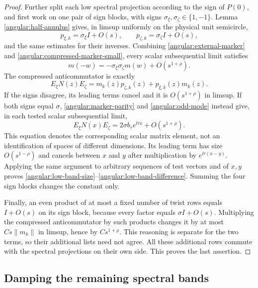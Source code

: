 \begin{proof}
Further split each low spectral projection according to the sign of
$P(0)$, and first work on one pair of sign blocks, with signs
$\sigma_\xi,\sigma_\zeta\in\{1,-1\}$.  Lemma
\ref{angular:half-annulus} gives, in limsup uniformly on the physical
unit semicircle,
\[
 p_{\xi,k}=\sigma_\xi I+O(s),\qquad
 p_{\zeta,k}=\sigma_\zeta I+O(s),
\]
and the same estimates for their inverses.  Combining
\eqref{angular:external-marker} and
\eqref{angular:compressed-marker-small}, every scalar subsequential
limit satisfies
\begin{equation}\label{angular:marker-parity}
 m(-w)=-\sigma_\xi\sigma_\zeta m(w)+O(s^{1+\rho}).
\end{equation}
The compressed anticommutator is exactly
\[
 E_\xi N(z)E_\zeta
 =m_k(z)p_{\zeta,k}(z)+p_{\xi,k}(z)m_k(z).
\]
If the signs disagree, its leading terms cancel and it is
$O(s^{1+\rho})$ in limsup.  If both signs equal $\sigma$,
\eqref{angular:marker-parity} and \eqref{angular:odd-mode} instead give,
in each tested scalar subsequential limit,
\begin{equation}\label{angular:leading-mode}
 E_\xi N(x)E_\zeta
 =2\sigma b_\tau e^{\ii\tau x}+O(s^{1+\rho}).
\end{equation}
This equation denotes the corresponding scalar matrix element, not
an identification of spaces of different dimensions.  Its leading
term has size $O(s^{1-\rho})$ and cancels between $x$ and $y$ after
multiplication by $e^{\ii\tau(x-y)}$.  Applying the same argument to
arbitrary sequences of test vectors and of $x,y$ proves
\eqref{angular:low-band-size}--\eqref{angular:low-band-difference}.
Summing the four sign blocks changes the constant only.

Finally, an even product of at most a fixed number of twist rows
equals $I+O(s)$ on its sign block, because every factor equals
$\sigma I+O(s)$.  Multiplying the compressed anticommutator by such
products changes it by at most $Cs\|m_k\|$ in limsup, hence by
$Cs^{1+\rho}$.  This reasoning is separate for the two terms, so their
additional lists need not agree.  All these additional rows commute
with the spectral projections on their own side.  This proves the
last assertion.
\end{proof}

\subsection{Damping the remaining spectral bands}

